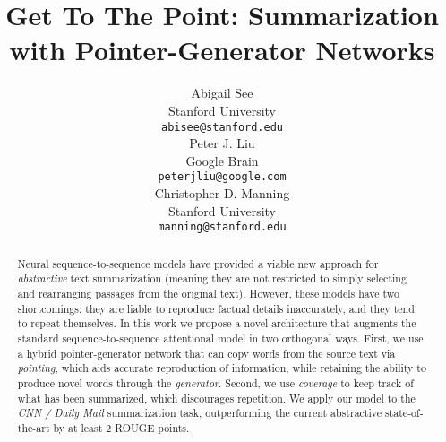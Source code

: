 \documentclass[11pt,a4paper]{article}
\title{Get To The Point: Summarization with Pointer-Generator Networks}
\author{Abigail See \\
Stanford University \\
  {\tt abisee@stanford.edu} \\\And
  Peter J. Liu \\
  Google Brain \\
  {\tt peterjliu@google.com} \\\And
	 Christopher D. Manning\\
 Stanford University \\
  {\tt manning@stanford.edu} \\}
\date{}
\begin{document}
\maketitle
\begin{abstract}
Neural sequence-to-sequence models have provided a viable new approach
for \textit{abstractive} text summarization (meaning they are not restricted to simply selecting and rearranging passages from the original text).
However, these models have two shortcomings: they are liable to reproduce factual details inaccurately, and they tend to repeat themselves.
In this work we propose a novel architecture that augments the standard sequence-to-sequence attentional model in two orthogonal ways.
First, we use a hybrid pointer-generator network that can copy words from the source text via \textit{pointing}, which aids accurate reproduction of information, while retaining the ability to produce novel words through the \textit{generator}.
Second, we use \textit{coverage} to keep track of what has been summarized, which discourages repetition.
We apply our model to the \textit{CNN / Daily Mail} summarization
task, outperforming the current abstractive state-of-the-art 
by at least 2 ROUGE points.
\end{abstract}
\end{document}
